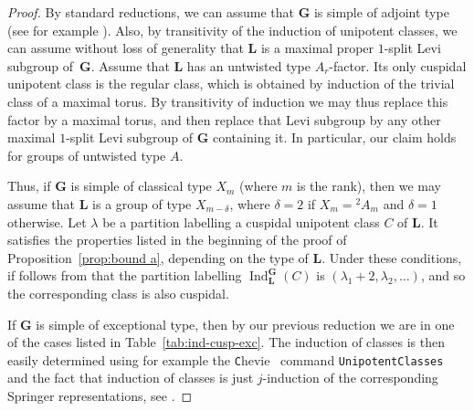 \documentclass[12pt,leqno,a4paper]{amsart}
\newcommand{\bG}{{\mathbf{G}}}
\newcommand{\bL}{{\mathbf{L}}}
\newcommand{\Ind}{{\operatorname{Ind}}}
\newcommand{\tw}[1]{{}^{#1}\!}
\newcommand{\Chevie}{{\texttt Chevie}{}}
\theoremstyle{remark}
\begin{document}
\begin{proof}
By standard reductions, we can assume that $\bG$ is simple of adjoint type
(see for example \cite[\S3.4]{GM96}). Also, by transitivity of the induction
of unipotent classes, we can assume without loss of generality that $\bL$ is
a maximal proper $1$-split Levi subgroup of~$\bG$.
Assume that $\bL$ has an untwisted type $A_r$-factor. Its only cuspidal
unipotent class is the regular class, which is obtained by induction of the
trivial class of a maximal torus. By transitivity of induction we may thus
replace this factor by a maximal torus, and then replace that Levi subgroup by
any other maximal $1$-split Levi subgroup of $\bG$ containing it. In
particular, our claim holds for groups of untwisted type $A$.
\par
Thus, if $\bG$ is simple of classical type $X_m$ (where $m$ is the rank), then
we may assume that $\bL$ is a group of type $X_{m-\delta}$, where $\delta = 2$
if $X_m = \tw2A_m$ and $\delta = 1$ otherwise.
Let $\lambda$ be a partition labelling a cuspidal unipotent class $C$ of $\bL$.
It satisfies the properties listed in the beginning of the proof of
Proposition~\ref{prop:bound a}, depending on the type of $\bL$. Under these
conditions, if follows from \cite[\S 7.3]{SpB} that the partition labelling
$\Ind_\bL^\bG(C)$ is $(\lambda_1+2,\lambda_2,\ldots)$, and so the corresponding
class is also cuspidal.
\par
If $\bG$ is simple of exceptional type, then by our previous reduction we are
in one of the cases listed in Table~\ref{tab:ind-cusp-exc}. The induction of
classes is then easily determined using for example the \Chevie\ \cite{ChM}
command {\tt UnipotentClasses} and the fact that induction of classes is just
$j$-induction of the corresponding Springer representations,
see \cite[4.1]{Sp85}.
\end{proof}
\end{document}

